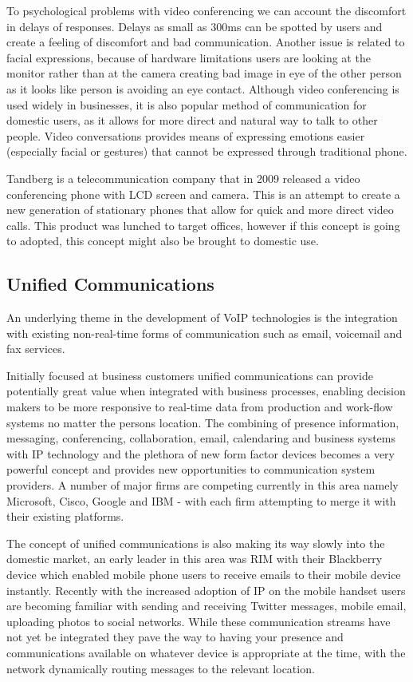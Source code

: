 To psychological problems with video conferencing we can account the discomfort in delays of responses. Delays as small as 300ms can be spotted by users and create a feeling of discomfort and bad communication. Another issue is related to facial expressions, because of hardware limitations users are looking at the monitor rather than at the camera creating bad image in eye of the other person as it looks like person is avoiding an eye contact\cite{website:vid_conf_overview}.
Although video conferencing is used widely in businesses, it is also popular method of communication for domestic users, as it allows for more direct and natural way to talk to other people. Video conversations provides means of expressing emotions easier (especially facial or gestures) that cannot be expressed through traditional phone. 

Tandberg is a telecommunication company that in 2009 released a video conferencing phone with LCD screen and camera. This is an attempt to create a new generation of stationary phones that allow for quick and more direct video calls. This product was lunched to target offices, however if this concept is going to adopted, this concept might also be brought to domestic use.

\subsection{Unified Communications}

An underlying theme in the development of VoIP technologies is the integration with existing non-real-time forms of communication such as email, voicemail and fax services.

Initially focused at business customers unified communications can provide potentially great value when integrated with business processes, enabling decision makers to be more responsive to real-time data from production and work-flow systems no matter the persons location. The combining of presence information, messaging, conferencing, collaboration, email, calendaring and business systems with IP technology and the plethora of new form factor devices becomes a very powerful concept and provides new opportunities to communication system providers. A number of major firms are competing currently in this area namely Microsoft, Cisco, Google and IBM - with each firm attempting to merge it with their existing platforms.

The concept of unified communications is also making its way slowly into the domestic market, an early leader in this area was RIM with their Blackberry device which enabled mobile phone users to receive emails to their mobile device instantly. Recently with the increased adoption of IP on the mobile handset users are becoming familiar with sending and receiving Twitter messages, mobile email, uploading photos to social networks. While these communication streams have not yet be integrated they pave the way to having your presence and communications available on whatever device is appropriate at the time, with the network dynamically routing messages to the relevant location.

